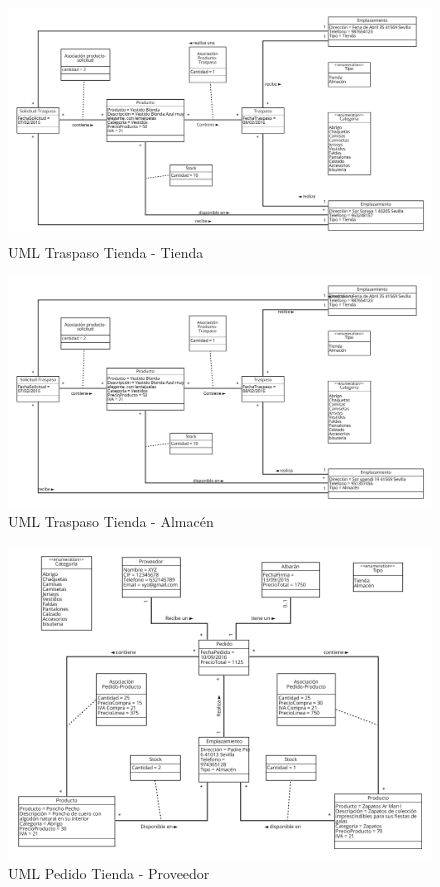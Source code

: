 \begin{figure}[H]
	\includegraphics[width=\linewidth]{images/pruebas/traspaso-tienda-tienda.png}
	\caption{UML Traspaso Tienda - Tienda}
\end{figure}

\begin{figure}[H]
	\includegraphics[width=\linewidth]{images/pruebas/traspaso-tienda-almacen.png}
	\caption{UML Traspaso Tienda - Almacén}
\end{figure}

\begin{figure}[H]
	\includegraphics[width=\linewidth]{images/pruebas/pedido-tienda-proveedor.png}
	\caption{UML Pedido Tienda - Proveedor}
\end{figure}

